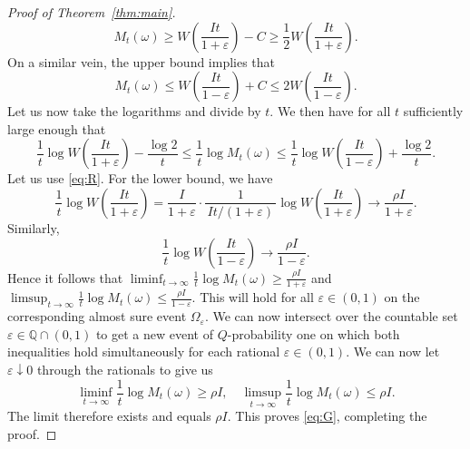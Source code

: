\documentclass[10pt,a4paper]{amsart}
\begin{document}
\begin{proof}[Proof of Theorem~\ref{thm:main}]
\[
M_t(\omega)\ge W\left(\frac{It}{1+\varepsilon}\right)-C\ge \frac{1}{2}W\left(\frac{It}{1+\varepsilon}\right).
\]
On a similar vein, the upper bound implies that
\[
M_t(\omega)\le W\left(\frac{It}{1-\varepsilon}\right)+C\le 2W\left(\frac{It}{1-\varepsilon}\right).
\]
Let us now take the logarithms and divide by $t$. We then have for all $t$ sufficiently large enough that
\[
\frac{1}{t}\log W\left(\frac{It}{1+\varepsilon}\right) - \frac{\log 2}{t} \le \frac{1}{t}\log M_t(\omega) \le \frac{1}{t}\log W\left(\frac{It}{1-\varepsilon}\right) + \frac{\log 2}{t}.
\]
Let us use \eqref{eq:R}. For the lower bound, we have
\[
\frac{1}{t}\log W\left(\frac{It}{1+\varepsilon}\right) = \frac{I}{1+\varepsilon} \cdot \frac{1}{\,It/(1+\varepsilon)\,} \log W\left(\frac{It}{1+\varepsilon}\right) \longrightarrow \frac{\rho I}{1+\varepsilon}.
\]
Similarly, 
\[
\frac{1}{t}\log W\left(\frac{It}{1-\varepsilon}\right)\longrightarrow \frac{\rho I}{1-\varepsilon}.
\]
Hence it follows that $\liminf_{t\to\infty} \frac{1}{t}\log M_t(\omega) \ge \frac{\rho I}{1+\varepsilon}$ and $\limsup_{t\to\infty} \frac{1}{t}\log M_t(\omega) \le \frac{\rho I}{1-\varepsilon}$. This will hold for all $\varepsilon\in(0,1)$ on the corresponding almost sure event $\Omega_{\varepsilon}$. We can now intersect over the countable set $\varepsilon\in \mathbb  Q\cap(0,1)$ to get a new event of $Q$-probability one on which both inequalities hold simultaneously for each rational $\varepsilon\in(0,1)$. We can now let $\varepsilon\downarrow 0$ through the rationals to give us
\[
\liminf_{t\to\infty}\frac{1}{t}\log M_t(\omega)\ge \rho I,\quad \limsup_{t\to\infty}\frac{1}{t}\log M_t(\omega)\le \rho I.
\]
The limit therefore exists and equals $\rho I$. This proves \eqref{eq:G}, completing the proof.
\end{proof}
\end{document}
